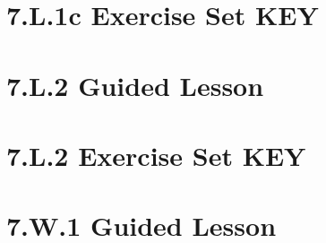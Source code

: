 \documentclass[a4paper,12pt]{article}
\begin{document}
\newpage
\section{7.L.1c Exercise Set KEY}


\newpage
\section{7.L.2 Guided Lesson}


\newpage
\section{7.L.2 Exercise Set KEY}


\newpage
\section{7.W.1 Guided Lesson}

\end{document}
